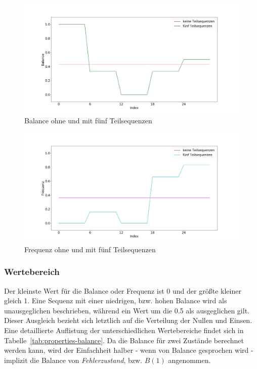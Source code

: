 \begin{theorem}
	\begin{figure}[H]
		\centering
		\includegraphics[scale=0.32]{images/sequences/subsequences-balance}
		\caption{Balance ohne und mit fünf Teilsequenzen}
		\label{fig:properties-subsequences-balance}
	\end{figure}
	
	\begin{figure}[H]
		\centering
		\includegraphics[scale=0.32]{images/sequences/subsequences-frequency}
		\caption{Frequenz ohne und mit fünf Teilsequenzen}
		\label{fig:properties-subsequences-frequency}
	\end{figure}
\end{theorem}

\subsubsection{Wertebereich}

Der kleinste Wert für die Balance oder Frequenz ist 0 und der größte kleiner gleich 1. Eine Sequenz mit einer niedrigen, bzw. hohen Balance wird als unausgeglichen beschrieben, während ein Wert um die 0.5 als ausgeglichen gilt. Dieser Ausgleich bezieht sich letztlich auf die Verteilung der Nullen und Einsen. Eine detaillierte Auflistung der unterschiedlichen Wertebereiche findet sich in Tabelle~\ref{tab:properties-balance}. Da die Balance für zwei Zustände berechnet werden kann, wird der Einfachheit halber - wenn von Balance gesprochen wird - implizit die Balance von \textit{Fehlerzustand}, bzw. $B(1)$ angenommen. 

